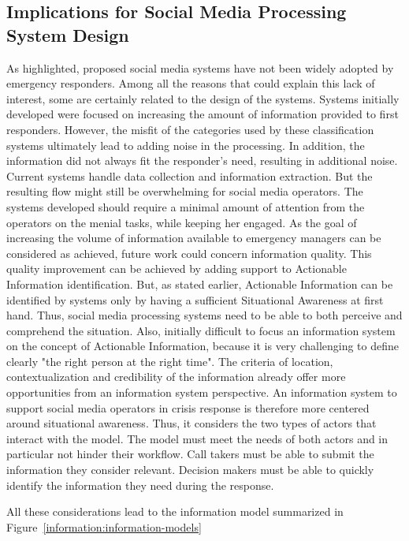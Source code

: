 \subsection{Implications for Social Media Processing System Design}
As \textcite{zadeSituationalAwarenessActionability2018} highlighted, proposed social media systems have not been widely adopted by emergency responders.
Among all the reasons that could explain this lack of interest, some are certainly related to the design of the systems.
Systems initially developed were focused on increasing the amount of information provided to first responders.
However, the misfit of the categories used by these classification systems ultimately lead to adding noise in the processing.
In addition, the information did not always fit the responder's need, resulting in additional noise.
Current systems handle data collection and information extraction.
But the resulting flow might still be overwhelming for social media operators.
The systems developed should require a minimal amount of attention from the operators on the menial tasks, while keeping her engaged.
As the goal of increasing the volume of information available to emergency managers can be considered as achieved, future work could concern information quality.
This quality improvement can be achieved by adding support to Actionable Information identification.
But, as stated earlier, Actionable Information can be identified by systems only by having a sufficient Situational Awareness at first hand.
Thus, social media processing systems need to be able to both perceive and comprehend the situation.
Also, initially difficult to focus an information system on the concept of Actionable Information,
because it is very challenging to define clearly "the right person at the right time".
The criteria of location, contextualization and credibility of the information already offer more opportunities from an information system perspective.
An information system to support social media operators in crisis response is therefore more centered around situational awareness.
Thus, it considers the two types of actors that interact with the model.
The model must meet the needs of both actors and in particular not hinder their workflow.
Call takers must be able to submit the information they consider relevant.
Decision makers must be able to quickly identify the information they need during the response.

All these considerations lead to the information model summarized in Figure~\ref{information:information-models}

